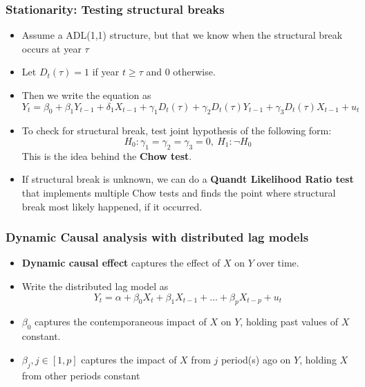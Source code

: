 \documentclass[aspectratio=169]{beamer}
\begin{document}
\begin{frame}
\frametitle{Stationarity: Testing structural breaks}
\begin{itemize}
\item Assume a ADL(1,1) structure, but that we know when the structural break occurs at year $\tau$ 
\item Let $D_t(\tau)=1$ if year $t\geq\tau$ and 0 otherwise. 
\item Then we write the equation as
\[
Y_t = \beta_0 +\beta_1Y_{t-1}+\delta_1 X_{t-1} + \gamma_1 D_t(\tau)+\gamma_2 D_t(\tau)Y_{t-1}+\gamma_3 D_t(\tau)X_{t-1}+u_t
\]
\item To check for structural break, test joint hypothesis of the following form:
\[
H_0: \gamma_1 = \gamma_2 = \gamma_3 =0, \ H_1: \lnot H_0
\]
This is the idea behind the \textbf{Chow test}. 
\item If structural break is unknown, we can do a \textbf{Quandt Likelihood Ratio test} that implements multiple Chow tests and finds the point where structural break most likely happened, if it occurred.  
\end{itemize}
\end{frame}

\begin{frame}
\frametitle{Dynamic Causal analysis with distributed lag models}
\begin{itemize}
\item \textbf{Dynamic causal effect} captures the effect of $X$ on $Y$ over time.
\item Write the distributed lag model as 
\[
Y_t = \alpha+\beta_0X_t + \beta_1X_{t-1}+...+\beta_pX_{t-p}+u_t
\]
\item $\beta_0$ captures the contemporaneous impact of $X$ on $Y$, holding past values of $X$ constant. 
\item $\beta_j , j\in[1,p]$ captures the impact of $X$ from $j$ period(s) ago on $Y$, holding $X$ from other periods constant
\end{itemize}
\end{frame}
\end{document}
